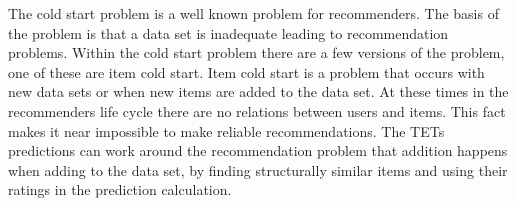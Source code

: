 The cold start problem is a well known problem for recommenders\cite{Ricci2015}\cite{saveski2014item}.
The basis of the problem is that a data set is 
inadequate leading to recommendation problems.
Within the cold start problem there are a few versions of the problem, one of these are item cold start.
Item cold start is a problem that occurs with new data sets or when new items are added to the data set.
At these times in the recommenders life cycle there are no relations between users and items.
This fact makes it near impossible to make reliable recommendations.
The TETs predictions can work around the recommendation problem that addition happens when adding to the data set, by finding structurally similar items and using their ratings in the prediction calculation.
